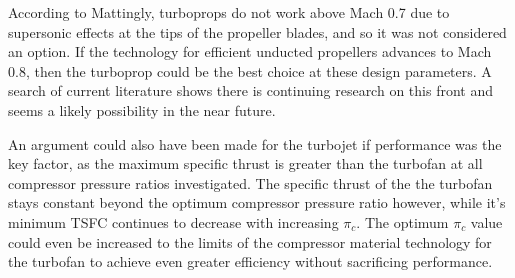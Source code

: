 \documentclass[]{aiaa-tc}%
\begin{document}
According to Mattingly, turboprops do not work above Mach 0.7 due to supersonic effects at the tips of the propeller blades, and so it was not considered an option\cite{mattingly}.  If the technology for efficient unducted propellers advances to Mach 0.8, then the turboprop could be the best choice at these design parameters.  A search of current literature shows there is continuing research on this front and seems a likely possibility in the near future.

An argument could also have been made for the turbojet if performance was the key factor, as the maximum specific thrust is greater than the turbofan at all compressor pressure ratios investigated.  The specific thrust of the the turbofan stays constant beyond the optimum compressor pressure ratio however, while it's minimum TSFC continues to decrease with increasing $\pi_{c}$.  The optimum $\pi_{c}$ value could even be increased to the limits of the compressor material technology for the turbofan to achieve even greater efficiency without sacrificing performance.  

\bigskip
\end{document}
